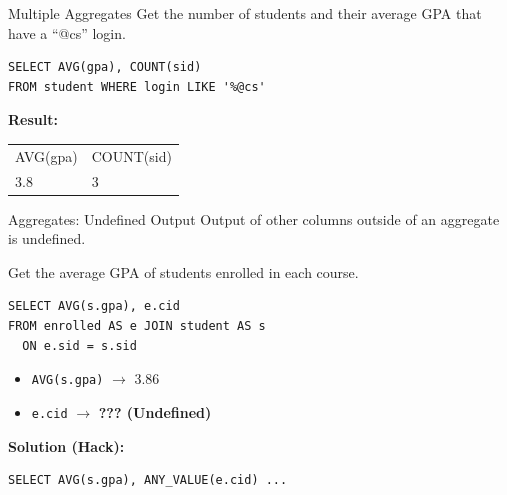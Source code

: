 \documentclass[aspectratio=169]{beamer}
\begin{document}
\begin{frame}[fragile]{Multiple Aggregates}
    Get the number of students and their average GPA that have a ``@cs'' login.
    
    \begin{lstlisting}
SELECT AVG(gpa), COUNT(sid)
FROM student WHERE login LIKE '%@cs'
    \end{lstlisting}
    
    \textbf{Result:}
    \begin{tabular}{ll}
    AVG(gpa) & COUNT(sid) \\
    3.8 & 3 
    \end{tabular}
\end{frame}

\begin{frame}[fragile]{Aggregates: Undefined Output}
    Output of other columns outside of an aggregate is undefined.
    
    Get the average GPA of students enrolled in each course.
    \begin{lstlisting}
SELECT AVG(s.gpa), e.cid
FROM enrolled AS e JOIN student AS s
  ON e.sid = s.sid
    \end{lstlisting}
    
    \begin{itemize}
        \item \texttt{AVG(s.gpa)} $\rightarrow$ 3.86
        \item \texttt{e.cid} $\rightarrow$ \textbf{??? (Undefined)}
    \end{itemize}
    
    \vspace{0.5cm}
    \textbf{Solution (Hack):}
    \begin{lstlisting}
SELECT AVG(s.gpa), ANY_VALUE(e.cid) ...
    \end{lstlisting}
\end{frame}
\end{document}
